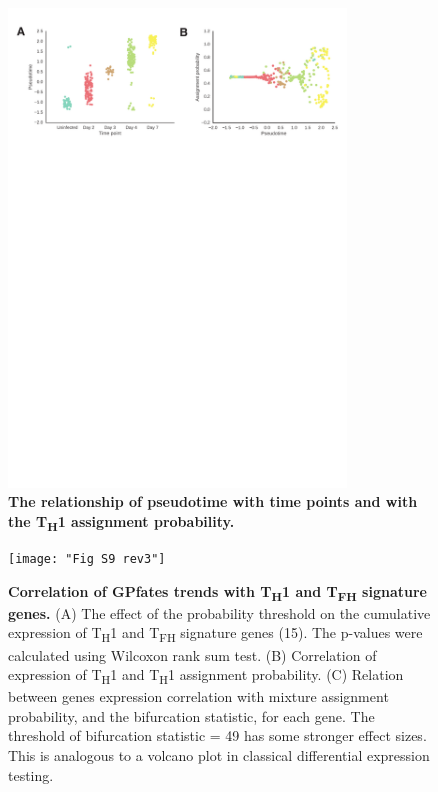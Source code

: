 \begin{figure}
    \centering
    \includegraphics[width=0.8\textwidth]{"Fig S8 rev3"}
    \caption[The relationship of pseudotime with time points and with the  T\textsubscript{H}\textnormal{1} assignment probability]{\textbf{The relationship of pseudotime with time points and with the  T\textsubscript{H}\textnormal{1} assignment probability.}}
    \label{fig:ms8}
\end{figure}

\begin{figure}
    \centering
    \texttt{[image: "Fig S9 rev3"]}
    \caption[Correlation of GPfates trends with T\textsubscript{H}\textnormal{1} and T\textsubscript{FH} signature genes]{\textbf{Correlation of GPfates trends with T\textsubscript{H}\textnormal{1} and T\textsubscript{FH} signature genes.} (A) The effect of the probability threshold on the cumulative expression of T\textsubscript{H}\textnormal{1} and T\textsubscript{FH} signature genes (15). The p-values were calculated using Wilcoxon rank sum test. (B) Correlation of expression of  T\textsubscript{H}\textnormal{1} and  T\textsubscript{H}\textnormal{1} assignment probability. (C) Relation between genes expression correlation with mixture assignment probability, and the bifurcation statistic, for each gene. The threshold of bifurcation statistic = 49 has some stronger effect sizes. This is analogous to a volcano plot in classical differential expression testing.}
    \label{fig:ms9}
\end{figure}

